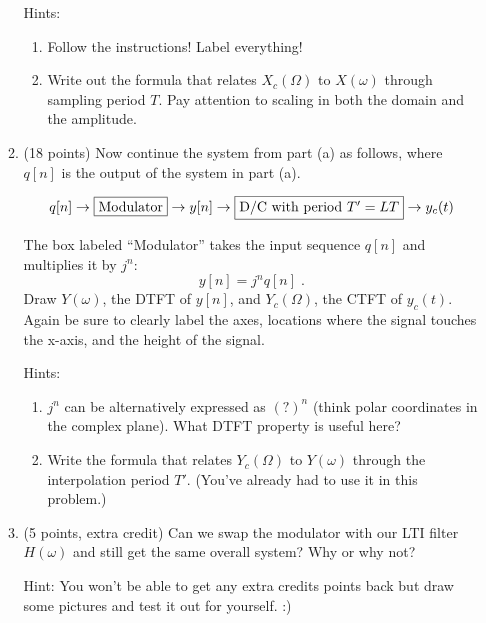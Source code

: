 \documentclass[]{siamltex}
\begin{document}
\begin{enumerate}
\begin{enumerate}
		Hints: 
		\begin{enumerate}
			\item Follow the instructions! Label everything!
			\item Write out the formula that relates $X_c(\Omega)$ to $X(\omega)$ through sampling period $T$. Pay attention to scaling in both the domain and the amplitude.
		\end{enumerate}
	
	\newpage
	\item (18 points) Now continue the system from part (a) as follows, where $q[n]$ is the output of the system in part (a).
	
	$$q[n] \rightarrow \fbox{Modulator} \rightarrow y[n] \rightarrow  \fbox{D/C with period $T' = LT$} \rightarrow y_c(t)$$
	
	
	The box labeled ``Modulator'' takes the input sequence $q[n]$ and multiplies it by $j^n$: $$y[n] = j^n q[n]\;.$$ Draw $Y(\omega)$, the DTFT of $y[n]$, and $Y_c(\Omega)$, the CTFT of $y_c(t)$. Again be sure to clearly label the axes, locations where the signal touches the x-axis, and the height of the signal.
	
	Hints: 
		\begin{enumerate}
			\item $j^n$ can be alternatively expressed as $(?)^n$ (think polar coordinates in the complex plane). What DTFT property is useful here?
			\item Write the formula that relates $Y_c(\Omega)$ to $Y(\omega)$ through the interpolation period $T'$. (You've already had to use it in this problem.)
		\end{enumerate}
	
	\vspace{4in}
	\item (5 points, extra credit) Can we swap the modulator with our LTI filter $H(\omega)$ and still get the same overall system? Why or why not?
	
	Hint: You won't be able to get any extra credits points back but draw some pictures and test it out for yourself. :)
	\end{enumerate}








\end{enumerate}
\end{document}
